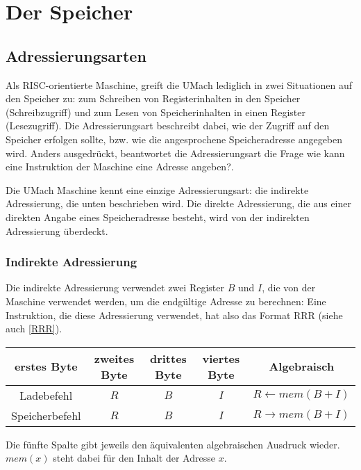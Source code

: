\section{Der Speicher}

\subsection{Adressierungsarten}
\label{subsec:Adressierungsarten}

Als RISC-orientierte Maschine, greift die UMach lediglich in zwei Situationen
auf den Speicher zu: zum Schreiben von Registerinhalten in den Speicher
(Schreibzugriff) und zum Lesen von Speicherinhalten in einen Register
(Lesezugriff).  Die \gls{Adressierungsart} beschreibt dabei, wie der Zugriff
auf den Speicher erfolgen sollte, bzw. wie die angesprochene Speicheradresse
angegeben wird. Anders ausgedrückt, beantwortet die Adressierungsart die Frage
\glqq wie kann eine Instruktion der Maschine eine Adresse angeben?\grqq. 

Die UMach Maschine kennt eine einzige Adressierungsart: die indirekte
Adressierung, die unten beschrieben wird. Die direkte Adressierung, die aus
einer direkten Angabe eines Speicheradresse besteht, wird von der indirekten
Adressierung überdeckt.

\subsubsection{Indirekte Adressierung}

Die indirekte Adressierung verwendet zwei Register $B$ und $I$, die
von der Maschine verwendet werden, um die endgültige Adresse zu berechnen:
Eine Instruktion, die diese Adressierung verwendet, hat also das Format RRR
(siehe auch \ref{RRR}).
\begin{center}
  \begin{tabular}{|*{4}{c|}|c|} \hline
    erstes Byte    & zweites Byte  & drittes Byte  & viertes Byte & Algebraisch
\\\hline\hline
    Ladebefehl     & $R$  & $B$  & $I$  & $R \gets mem(B + I)$ \\\hline
    Speicherbefehl & $R$  & $B$  & $I$  & $R \to   mem(B + I)$ \\\hline
  \end{tabular}
\end{center}
Die fünfte Spalte gibt jeweils den äquivalenten algebraischen Ausdruck wieder.
$mem(x)$ steht dabei für den Inhalt der Adresse $x$.


